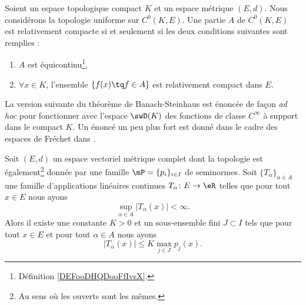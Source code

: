 \begin{theorem}        \label{ThoKRbtpah}
	Soient un espace topologique compact \( K\) et un espace métrique \( (E,d)\). Nous considérons la topologie uniforme sur \( C^0(K,E)\). Une partie \( A\) de \( C^0(K,E)\) est relativement compacte si et seulement si les deux conditions suivantes sont remplies :
	\begin{enumerate}
		\item
		      \( A\) est équicontinu\footnote{Définition \ref{DEFooDHQDooFfIvsX}.},
		\item
		      \( \forall x\in K\), l'ensemble \( \{ f(x)\tq f\in A \}\) est relativement compact dans \( E\).
	\end{enumerate}
\end{theorem}

La version suivante du théorème de Banach-Steinhaus est énoncée de façon \emph{ad hoc} pour fonctionner avec l'espace \( \swD(K)\) des fonctions de classe \(  C^{\infty}\) à support dans le compact \( K\). Un énoncé un peu plus fort est donné dans le cadre des espaces de Fréchet dans \cite{TQSWRiz}.
\begin{theorem}  \label{ThoNBrmGIg}
	Soit \( (E,d)\) un espace vectoriel métrique complet dont la topologie est également\footnote{Au sens où les ouverts sont les mêmes.} donnée par une famille \( \mP=\{ p_i \}_{i\in I}\) de seminormes. Soit \( \{ T_{\alpha} \}_{\alpha\in A}\) une famille d'applications linéaires continues \( T_{\alpha}\colon E\to \eR\) telles que pour tout \( x\in E\) nous ayons
	\begin{equation}
		\sup_{\alpha\in A}\big| T_{\alpha}(x) \big|<\infty.
	\end{equation}
	Alors il existe une constante \( K>0\) et un sous-ensemble fini \( J\subset I\) tels que pour tout \( x\in E\) et pour tout \( \alpha\in A\) nous ayons
	\begin{equation}    \label{EqIFNGhtr}
		\big| T_{\alpha} (x)\big|\leq K\max_{j\in J}p_j(x).
	\end{equation}
\end{theorem}

